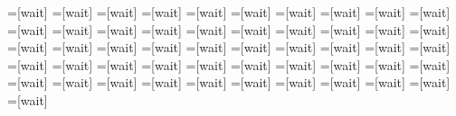 
=[wait]	%
=[wait]	%
=[wait]	%
=[wait]	%
=[wait]	%
=[wait]	%
=[wait]	%
=[wait]	%
=[wait]	%
=[wait]	%
=[wait]	%
=[wait]	%
=[wait]	%
=[wait]	%
=[wait]	%
=[wait]	%
=[wait]	%
=[wait]	%
=[wait]	%
=[wait]	%
=[wait]	%
=[wait]	%
=[wait]	%
=[wait]	%
=[wait]	%
=[wait]	%
=[wait]	%
=[wait]	%
=[wait]	%
=[wait]	%
=[wait]	%
=[wait]	%
=[wait]	%
=[wait]	%
=[wait]	%
=[wait]	%
=[wait]	%
=[wait]	%
=[wait]	%
=[wait]	%
=[wait]	%
=[wait]	%
=[wait]	%
=[wait]	%
=[wait]	%
=[wait]	%
=[wait]	%
=[wait]	%
=[wait]	%
=[wait]	%
=[wait]	%
